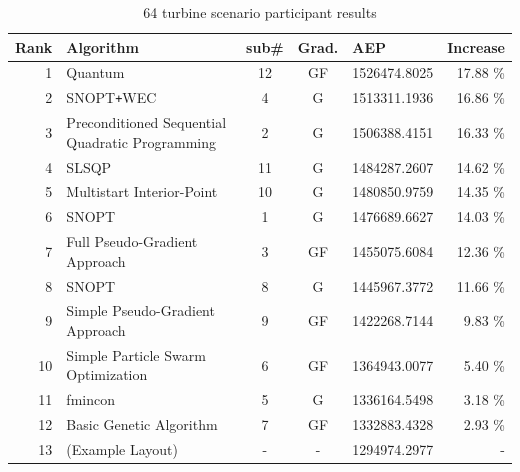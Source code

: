 \documentclass[conf,hidelinks]{new-aiaa} %
\begin{document}
\begin{table}[h!]
    \begin{center}
        \caption{64 turbine scenario participant results}
        \label{tab:results3}
        \begin{tabular}{r l c c l r}
            \hline
            Rank	& Algorithm											& sub\#	& Grad.	& AEP			& Increase		\\	%
            \hline
            1       & Quantum								            & 12    & GF	& 1526474.8025	&	17.88 \% 	\\ %
            2		& SNOPT\texttt{+}WEC								& 4 	& G		& 1513311.1936	&	16.86 \% 	\\ %
			3		& Preconditioned Sequential Quadratic Programming	& 2		& G		& 1506388.4151	&	16.33 \% 	\\ %
			4		& SLSQP												& 11	& G		& 1484287.2607	&	14.62 \% 	\\ %
            5		& Multistart Interior-Point							& 10	& G		& 1480850.9759	&	14.35 \% 	\\ %
            6		& SNOPT												& 1		& G		& 1476689.6627 	&	14.03 \% 	\\ %
			7		& Full Pseudo-Gradient Approach						& 3		& GF	& 1455075.6084	&	12.36 \% 	\\ %
            8		& SNOPT												& 8		& G		& 1445967.3772	&	11.66 \% 	\\ %
            9		& Simple Pseudo-Gradient Approach					& 9		& GF	& 1422268.7144	&	9.83 \% 	\\ %
            10		& Simple Particle Swarm Optimization				& 6		& GF    & 1364943.0077	&	5.40 \% 	\\ %
            11		& fmincon											& 5		& G		& 1336164.5498 	&	3.18 \% 	\\ %
            12		& Basic Genetic Algorithm							& 7		& GF	& 1332883.4328	&	2.93 \% 	\\ %
            13		& (Example Layout)									& -		& -		& 1294974.2977	&	- 			\\ %
            \hline
        \end{tabular}
    \end{center}
\end{table}
\end{document}
